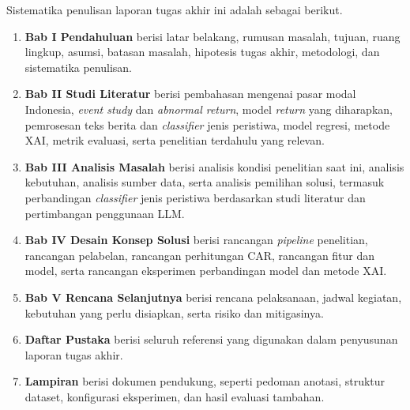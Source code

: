 Sistematika penulisan laporan tugas akhir ini adalah sebagai berikut.
\begin{enumerate}
    \item \textbf{Bab I Pendahuluan} berisi latar belakang, rumusan masalah, tujuan, ruang lingkup, asumsi, batasan masalah, hipotesis tugas akhir, metodologi, dan sistematika penulisan.
    \item \textbf{Bab II Studi Literatur} berisi pembahasan mengenai pasar modal Indonesia, \emph{event study} dan \emph{abnormal return}, model \emph{return} yang diharapkan, pemrosesan teks berita dan \emph{classifier} jenis peristiwa, model regresi, metode XAI, metrik evaluasi, serta penelitian terdahulu yang relevan.
    \item \textbf{Bab III Analisis Masalah} berisi analisis kondisi penelitian saat ini, analisis kebutuhan, analisis sumber data, serta analisis pemilihan solusi, termasuk perbandingan \emph{classifier} jenis peristiwa berdasarkan studi literatur dan pertimbangan penggunaan LLM.
    \item \textbf{Bab IV Desain Konsep Solusi} berisi rancangan \emph{pipeline} penelitian, rancangan pelabelan, rancangan perhitungan CAR, rancangan fitur dan model, serta rancangan eksperimen perbandingan model dan metode XAI.
    \item \textbf{Bab V Rencana Selanjutnya} berisi rencana pelaksanaan, jadwal kegiatan, kebutuhan yang perlu disiapkan, serta risiko dan mitigasinya.
    \item \textbf{Daftar Pustaka} berisi seluruh referensi yang digunakan dalam penyusunan laporan tugas akhir.
    \item \textbf{Lampiran} berisi dokumen pendukung, seperti pedoman anotasi, struktur dataset, konfigurasi eksperimen, dan hasil evaluasi tambahan.
\end{enumerate}
